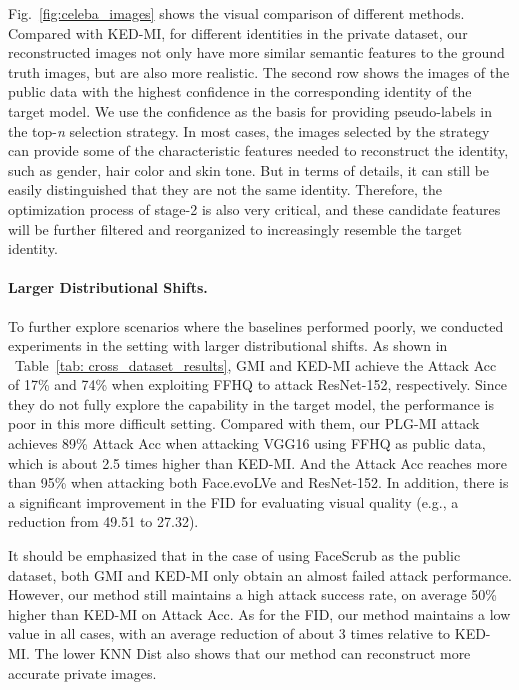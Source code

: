 \documentclass[letterpaper]{article} %
\newcommand{\Tref}[1]{Table~\ref{#1}}
\newcommand{\Fref}[1]{Fig.~\ref{#1}}
\begin{document}
\Fref{fig:celeba_images} shows the visual comparison of different methods. Compared with KED-MI, for different identities in the private dataset, our reconstructed images not only have more similar semantic features to the ground truth images, but are also more realistic. The second row shows the images of the public data with the highest confidence in the corresponding identity of the target model. We use the confidence as the basis for providing pseudo-labels in the top-\emph{n} selection strategy. In most cases, the images selected by the strategy can provide some of the characteristic features needed to reconstruct the identity, such as gender, hair color and skin tone. But in terms of details, it can still be easily distinguished that they are not the same identity. Therefore, the optimization process of stage-2 is also very critical, and these candidate features will be further filtered and reorganized to increasingly resemble the target identity.
	
	

\paragraph{Larger Distributional Shifts.}
To further explore scenarios where the baselines performed poorly, we conducted experiments in the setting with larger distributional shifts. As shown in ~\Tref{tab: cross_dataset_results}, GMI and KED-MI achieve the Attack Acc of 17\% and 74\% when exploiting FFHQ to attack ResNet-152, respectively. Since they do not fully explore the capability in the target model, the performance is poor in this more difficult setting. Compared with them, our PLG-MI attack achieves 89\% Attack Acc when attacking VGG16 using FFHQ as public data, which is about 2.5 times higher than KED-MI. And the Attack Acc reaches more than 95\% when attacking both Face.evoLVe and ResNet-152. In addition, there is a significant improvement in the FID for evaluating visual quality (e.g., a reduction from 49.51 to 27.32).
    
It should be emphasized that in the case of using FaceScrub as the public dataset, both GMI and KED-MI only obtain an almost failed attack performance. However, our method still maintains a high attack success rate, on average 50\% higher than KED-MI on Attack Acc. As for the FID, our method maintains a low value in all cases, with an average reduction of about 3 times relative to KED-MI. The lower KNN Dist also shows that our method can reconstruct more accurate private images. 
    
\end{document}

